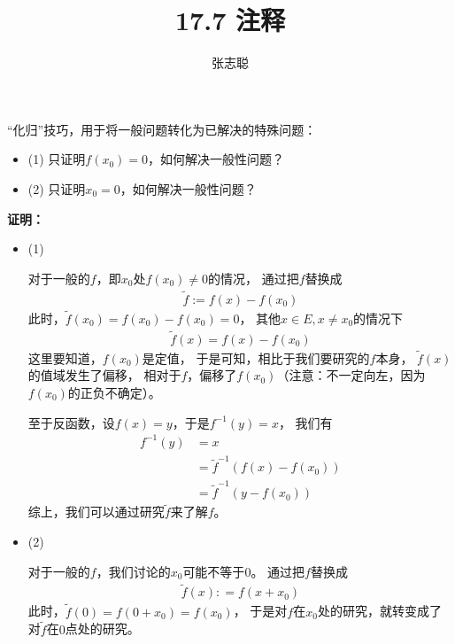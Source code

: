 \documentclass{article}
\begin{document}
\title{17.7 注释}
\author{张志聪}
\maketitle

\begin{zremark}
  “化归”技巧，用于将一般问题转化为已解决的特殊问题：
  \begin{itemize}
    \item (1) 只证明$f(x_0) = 0$，如何解决一般性问题？
    \item (2) 只证明$x_0 = 0$，如何解决一般性问题？
  \end{itemize}
\end{zremark}

\textbf{证明：}

\begin{itemize}
  \item (1)

        对于一般的$f$，即$x_0$处$f(x_0) \neq 0$的情况，
        通过把$f$替换成
        \begin{align*}
          \tilde{f} := f(x) - f(x_0)
        \end{align*}
        此时，$\tilde{f}(x_0) = f(x_0) - f(x_0) = 0$，
        其他$x \in E, x \neq x_0$的情况下
        \begin{align*}
          \tilde{f}(x) = f(x) - f(x_0)
        \end{align*}
        这里要知道，$f(x_0)$是定值，
        于是可知，相比于我们要研究的$f$本身，
        $\tilde{f}(x)$的值域发生了偏移，
        相对于$f$，偏移了$f(x_0)$（注意：不一定向左，因为$f(x_0)$的正负不确定）。

        至于反函数，设$f(x) = y$，于是$f^{-1}(y) = x$，
        我们有
        \begin{align*}
          f^{-1}(y) & = x                             \\
                    & = \tilde{f}^{-1}(f(x) - f(x_0)) \\
                    & = \tilde{f}^{-1}(y - f(x_0))
        \end{align*}
        综上，我们可以通过研究$\tilde{f}$来了解$f$。

  \item (2)

        对于一般的$f$，我们讨论的$x_0$可能不等于$0$。
        通过把$f$替换成
        \begin{align*}
          \tilde{f}(x) : = f(x + x_0)
        \end{align*}
        此时，$\tilde{f}(0) = f(0 + x_0) = f(x_0)$，
        于是对$f$在$x_0$处的研究，就转变成了对$\tilde{f}$在$0$点处的研究。


\end{itemize}
\end{document}
